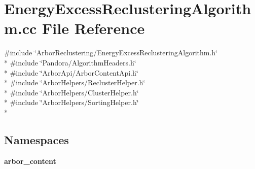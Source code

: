 \section{Energy\+Excess\+Reclustering\+Algorithm.\+cc File Reference}
\label{EnergyExcessReclusteringAlgorithm_8cc}
{\ttfamily \#include \char`\"{}Arbor\+Reclustering/\+Energy\+Excess\+Reclustering\+Algorithm.\+h\char`\"{}}\\*
{\ttfamily \#include \char`\"{}Pandora/\+Algorithm\+Headers.\+h\char`\"{}}\\*
{\ttfamily \#include \char`\"{}Arbor\+Api/\+Arbor\+Content\+Api.\+h\char`\"{}}\\*
{\ttfamily \#include \char`\"{}Arbor\+Helpers/\+Recluster\+Helper.\+h\char`\"{}}\\*
{\ttfamily \#include \char`\"{}Arbor\+Helpers/\+Cluster\+Helper.\+h\char`\"{}}\\*
{\ttfamily \#include \char`\"{}Arbor\+Helpers/\+Sorting\+Helper.\+h\char`\"{}}\\*
\subsection*{Namespaces}
\begin{DoxyCompactItemize}
\item 
 {\bf arbor\+\_\+content}
\end{DoxyCompactItemize}
